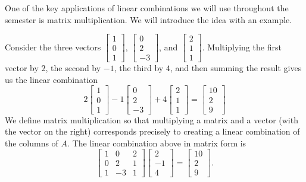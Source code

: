One of the key applications of linear combinations we will use throughout the semester is matrix multiplication. We will introduce the idea with an example.  
\begin{example}
Consider the three vectors 
$\begin{bmatrix}1\\0\\1\end{bmatrix}$,
$\begin{bmatrix}0\\2\\-3\end{bmatrix}$,
and 
$\begin{bmatrix}2\\1\\1\end{bmatrix}$.
Multiplying the first vector by $2$, the second by $-1$, the third by $4$, and then summing the result gives us the linear combination
$$2\begin{bmatrix}1\\0\\1\end{bmatrix}
-1\begin{bmatrix}0\\2\\-3\end{bmatrix}
+4\begin{bmatrix}2\\1\\1\end{bmatrix}
=
\begin{bmatrix}10\\2\\9\end{bmatrix} 
$$
We define matrix multiplication so that multiplying a matrix and a vector (with the vector on the right) corresponds precisely to creating a linear combination of the columns of $A$. 
The linear combination above in matrix form is
$$ 
\begin{bmatrix}1&0&2\\0&2&1\\1&-3&1\end{bmatrix}
\begin{bmatrix}2\\-1\\4\end{bmatrix}
=
\begin{bmatrix}10\\2\\9\end{bmatrix} 
.$$
\end{example}

